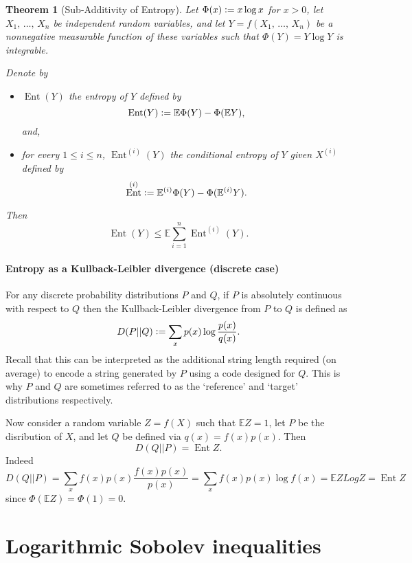 \documentclass{amsproc}
\newtheorem{theorem}{Theorem}
\newcommand{\defeq}{\vcentcolon=} %
\newcommand{\E}{\mathbb{E}} %
\DeclareMathOperator{\Ent}{Ent} %
\begin{document}
\begin{theorem}[Sub-Additivity of Entropy]
\label{thm:sub_add_entropy}
	Let $\Phi(x) \defeq x\log x$ for $x>0$, let $X_1,\,\dots,\,X_n$ be independent random variables, and
	let $Y = f(X_1,\,\dots,\,X_n)$ be a nonnegative measurable function of these variables such that $\Phi(Y) = Y\log Y$ is integrable.

	Denote by 
	\begin{itemize}
		\item	$\Ent (Y)$ the \emph{entropy} of $Y$ defined by $$\Ent (Y) \defeq \E\Phi (Y) - \Phi(\E Y),$$ and,
		\item	for every $1\leq i \leq n$, $\Ent^{(i)} (Y)$ the \emph{conditional entropy} of $Y$ given $X^{(i)}$
			defined by $$\Ent^{(i)} \defeq \E^{(i)}\Phi (Y) - \Phi(\E^{(i)} Y).$$
	\end{itemize}

	Then $$\Ent (Y) \leq \E \sum_{i=1}^n \Ent^{(i)} (Y).$$
\end{theorem}

\paragraph{\textbf{Entropy as a Kullback-Leibler divergence (discrete case)}}
\label{rmk:entropy_as_KL_divergence}
	For any discrete probability distributions $P$ and $Q$, if $P$ is absolutely continuous with respect to $Q$ then the Kullback-Leibler divergence from $P$ to $Q$ is defined as
	$$D(P||Q) \defeq \sum_x p(x) \log \frac{p(x)}{q(x)}.$$
	Recall that this can be interpreted as the additional string length required (on average) to encode a string generated by $P$ using a code designed for $Q$.
	This is why $P$ and $Q$ are sometimes referred to as the `reference' and `target' distributions respectively.

	Now consider a random variable $Z=f(X)$ such that $\E Z=1$, let $P$ be the disribution of $X$, and let $Q$ be defined via $q(x) = f(x) p(x)$.
	Then $$D(Q||P) = \Ent Z.$$
	Indeed $$D(Q||P) = \sum_x f(x) p(x) \frac{f(x) p(x)}{p(x)} = \sum_x f(x) p(x) \log f(x) = \E Z Log Z = \Ent Z$$
	since $\Phi(\E Z) = \Phi(1) = 0$.


\section{Logarithmic Sobolev inequalities}
\label{sec:log_Sob_ineq}
\end{document}
